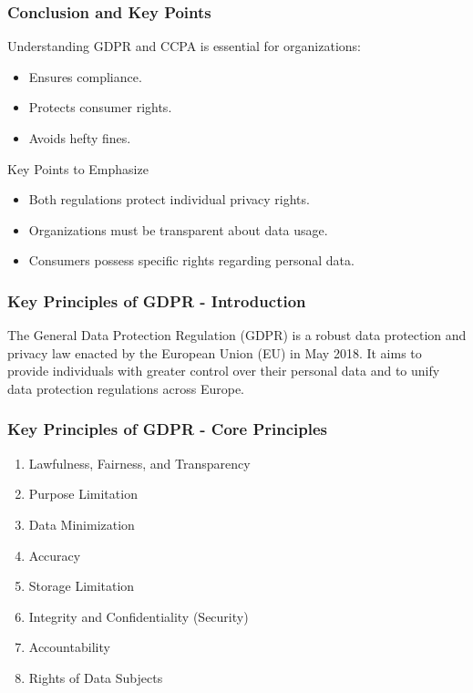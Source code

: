 \documentclass{beamer}
\begin{document}
\begin{frame}[fragile]
    \frametitle{Conclusion and Key Points}
    Understanding GDPR and CCPA is essential for organizations:
    \begin{itemize}
        \item Ensures compliance.
        \item Protects consumer rights.
        \item Avoids hefty fines.
    \end{itemize}
    \begin{block}{Key Points to Emphasize}
        \begin{itemize}
            \item Both regulations protect individual privacy rights.
            \item Organizations must be transparent about data usage.
            \item Consumers possess specific rights regarding personal data.
        \end{itemize}
    \end{block}
\end{frame}

\begin{frame}[fragile]
    \frametitle{Key Principles of GDPR - Introduction}
    The General Data Protection Regulation (GDPR) is a robust data protection and privacy law enacted by the European Union (EU) in May 2018. It aims to provide individuals with greater control over their personal data and to unify data protection regulations across Europe.
\end{frame}

\begin{frame}[fragile]
    \frametitle{Key Principles of GDPR - Core Principles}
    \begin{enumerate}
        \item Lawfulness, Fairness, and Transparency
        \item Purpose Limitation
        \item Data Minimization
        \item Accuracy
        \item Storage Limitation
        \item Integrity and Confidentiality (Security)
        \item Accountability
        \item Rights of Data Subjects
    \end{enumerate}
\end{frame}
\end{document}
